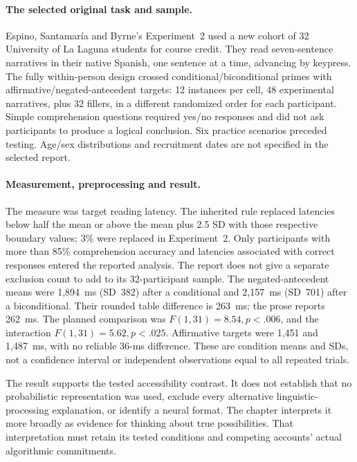 \paragraph{The selected original task and sample.}
Espino, Santamar\'{i}a and Byrne's Experiment~2 used a new cohort of
32 University of La Laguna students for course credit. They read
seven-sentence narratives in their native Spanish, one sentence at a
time, advancing by keypress. The fully within-person design crossed
conditional/biconditional primes with affirmative/negated-antecedent
targets: 12 instances per cell, 48 experimental narratives, plus
32 fillers, in a different randomized order for each participant.
Simple comprehension questions required yes/no responses and did not
ask participants to produce a logical conclusion. Six practice
scenarios preceded testing. Age/sex distributions and recruitment
dates are not specified in the selected report.
\cite[pp.~1074--1077]{EspinoSantamariaByrne2009True}

\paragraph{Measurement, preprocessing and result.}
The measure was target reading latency. The inherited rule replaced
latencies below half the mean or above the mean plus 2.5 SD with
those respective boundary values; 3\% were replaced in Experiment~2.
Only participants with more than 85\% comprehension accuracy and
latencies associated with correct responses entered the reported
analysis. The report does not give a separate exclusion count to
add to its 32-participant sample.
The negated-antecedent means were 1,894~ms (SD~382) after a
conditional and 2,157~ms (SD~701) after a biconditional. Their rounded
table difference is 263~ms; the prose reports 262~ms. The planned
comparison was \(F(1,31)=8.54,p<.006\), and the interaction
\(F(1,31)=5.62,p<.025\). Affirmative targets were 1,451 and
1,487~ms, with no reliable 36-ms difference. These are condition
means and SDs, not a confidence interval or independent observations
equal to all repeated trials.

The result supports the tested accessibility contrast. It does not
establish that no probabilistic representation was used, exclude every
alternative linguistic-processing explanation, or identify a neural
format. The chapter interprets it more broadly as evidence for thinking
about true possibilities. That interpretation must retain its tested
conditions and competing accounts' actual algorithmic commitments.

